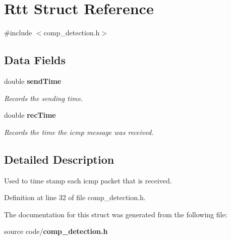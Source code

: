 \section{Rtt Struct Reference}
\label{struct_rtt}


{\ttfamily \#include $<$comp\-\_\-detection.\-h$>$}

\subsection*{Data Fields}
\begin{DoxyCompactItemize}
\item 
double {\bf send\-Time}\label{struct_rtt_ad39889e213ea221de1e1d807cf11151a}

\begin{DoxyCompactList}\small\item\em Records the sending time. \end{DoxyCompactList}\item 
double {\bf rec\-Time}\label{struct_rtt_ad6f6e3b6ec4400945f15289aec1f9974}

\begin{DoxyCompactList}\small\item\em Records the time the icmp message was received. \end{DoxyCompactList}\end{DoxyCompactItemize}


\subsection{Detailed Description}
Used to time stamp each icmp packet that is received. 

Definition at line 32 of file comp\-\_\-detection.\-h.



The documentation for this struct was generated from the following file\-:\begin{DoxyCompactItemize}
\item 
source code/{\bf comp\-\_\-detection.\-h}\end{DoxyCompactItemize}
